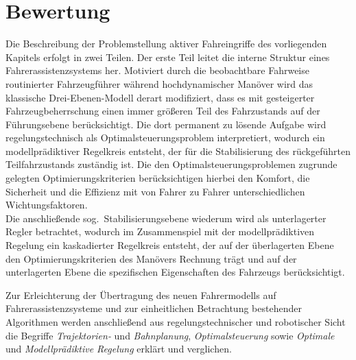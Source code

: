 \section{Bewertung} \label{sec:grundlagen_bewertung}
Die Beschreibung der Problemstellung aktiver Fahreingriffe des vorliegenden Kapitels erfolgt in zwei Teilen.
Der erste Teil leitet die interne Struktur eines Fahrerassistenzsystems her. Motiviert durch die beobachtbare Fahrweise routinierter Fahrzeugführer während hochdynamischer Manöver wird das klassische Drei-Ebenen-Modell derart modifiziert, dass es mit gesteigerter Fahrzeugbeherrschung einen immer größeren Teil des Fahrzustands auf der Führungsebene berücksichtigt. Die dort permanent zu lösende Aufgabe wird regelungstechnisch als Optimalsteuerungsproblem interpretiert, wodurch ein modellprädiktiver Regelkreis entsteht, der für die Stabilisierung des rückgeführten Teilfahrzustands zuständig ist. Die den Optimalsteuerungsproblemen zugrunde gelegten Optimierungskriterien berücksichtigen hierbei den Komfort, die Sicherheit und die Effizienz mit von Fahrer zu Fahrer unterschiedlichen Wichtungsfaktoren. \\
Die anschließende sog.\ Stabilisierungsebene wiederum wird als unterlagerter Regler betrachtet, wodurch im Zusammenspiel mit der modellprädiktiven Regelung ein kaskadierter Regelkreis entsteht, der auf der überlagerten Ebene den Optimierungskriterien des Manövers Rechnung trägt und auf der unterlagerten Ebene die spezifischen Eigenschaften des Fahrzeugs berücksichtigt.

Zur Erleichterung der Übertragung des neuen Fahrermodells auf Fahrerassistenzsysteme und zur einheitlichen Betrachtung bestehender Algorithmen werden anschließend aus regelungstechnischer und robotischer Sicht die Begriffe \emph{Trajektorien-} und \emph{Bahnplanung}, \emph{Optimalsteuerung} sowie \emph{Optimale} und \emph{Modellprädiktive Regelung} erklärt und verglichen. 

